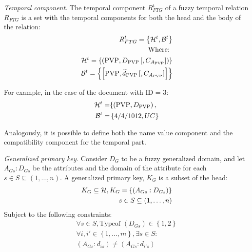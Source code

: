 \begin{definition}
\label{def:temporal-component}
\emph{Temporal component.}
The temporal component $R^{t}_{FTG}$ of a fuzzy temporal relation $R_{FTG}$ is a set with the temporal components for both the head and the body of the relation:
\begin{align}
\label{eq:temporal-component}
R^{t}_{FTG} = \left \lbrace \mathcal{H}^{t},\mathcal{B}^{t} \right \rbrace \\
\nonumber
\text{Where: } \\
\nonumber
\mathcal{H}^{t} = \left \lbrace \left( \text{PVP}, D_{\text{PVP}}\left[,C_{A_{\text{PVP}}} \right] \right) \right \rbrace \\
\nonumber
\mathcal{B}^ {t} = \left \lbrace  \left[ \text{PVP}, \widetilde{d}_{\text{PVP}} \left[,C_{A_{\text{PVP}}} \right] \right]  \right \rbrace 
\end{align}
\end{definition}

For example, in the case of the document with ID = 3:
\begin{align}
\nonumber
\mathcal{H}^{t} = & \lbrace \left( \text{PVP}, D_{\text{PVP}}\right),\\
\nonumber
\mathcal{B}^ {t} =& \left \lbrace 4/4/1012 , UC \right \rbrace 
\end{align}


Analogously, it is possible to define both the name value component and the compatibility component for the temporal part.


\begin{definition}
\label{def:generalized-primary-key}
\emph{Generalized primary key.}
Consider $D_G$ to be a fuzzy generalized domain, and let $A_{Gs}:D_{Gs}$ be the attributes and the domain of the attribute for each $s \in S \subseteq \left(1, \ldots, n \right)$.
A generalized primary key, $K_G$ is a subset of the head:
\begin{align}
\label{eq:generalized-primary-key}
K_G \subseteq \mathcal{H}, K_G = \left \lbrace  \left(A_{Gs}:D_{Gs} \right) \right \rbrace \\
\nonumber
s\in S \subseteq \left(1, \ldots, n \right) \\
\end{align}
Subject to the following constraints:
\begin{align}
\forall s \in S, \text{Typeof } \left(D_{Gs} \right) \in \left \lbrace 1, 2 \right \rbrace \\
\nonumber
\forall i, i' \in \left \lbrace 1, \ldots, m\right \rbrace , \exists s \in S: \\
\nonumber
\left(A_{Gs}:d_{is} \right) \neq \left(A_{Gs}:d_{i's} \right)
\end{align}
\end{definition}

